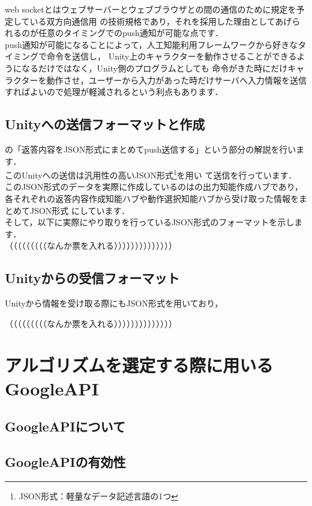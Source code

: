 web socketとはウェブサーバーとウェブブラウザとの間の通信のために規定を予定している双方向通信用
の技術規格であり，それを採用した理由としてあげられるのが任意のタイミングでのpush通知が可能な点です．\\

push通知が可能になることによって，人工知能利用フレームワークから好きなタイミングで命令を送信し，
Unity上のキャラクターを動作させることができるようになるだけではなく，Unity側のプログラムとしても
命令がきた時にだけキャラクターを動作させ，ユーザーから入力があった時だけサーバへ入力情報を送信
すればよいので処理が軽減されるという利点もあります．\\

\subsection{Unityへの送信フォーマットと作成}
の「返答内容をJSON形式にまとめてpush送信する」という部分の解説を行います．\\
このUnityへの送信は汎用性の高いJSON形式\footnote{JSON形式：軽量なデータ記述言語の1つ}を用い
て送信を行っています．\\

このJSON形式のデータを実際に作成しているのはの出力知能作成ハブであり，
各それぞれの返答内容作成知能ハブや動作選択知能ハブから受け取った情報をまとめてJSON形式
にしています．\\

そして，以下に実際にやり取りを行っているJSON形式のフォーマットを示します．\\

（（（（（（（（（なんか票を入れる））））））））））））））

\subsection{Unityからの受信フォーマット}
Unityから情報を受け取る際にもJSON形式を用いており，


（（（（（（（（（なんか票を入れる））））））））））））））

\newpage

\section{アルゴリズムを選定する際に用いるGoogleAPI}
\subsection{GoogleAPIについて}
\subsection{GoogleAPIの有効性}
